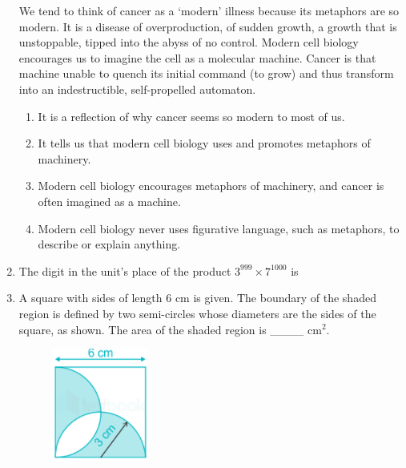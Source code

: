 \documentclass[12pt]{article}
\theoremstyle{remark}
\begin{document}
\begin{enumerate}
We tend to think of cancer as a ‘modern’ illness because its metaphors are so modern. It is a disease of overproduction, of sudden growth, a growth that is unstoppable, tipped into the abyss of no control. Modern cell biology encourages us to imagine the cell as a molecular machine. Cancer is that machine unable to quench its initial command (to grow) and thus transform into an indestructible, self-propelled automaton.\\
\begin{enumerate}
\item It is a reflection of why cancer seems so modern to most of us.
\item It tells us that modern cell biology uses and promotes metaphors of machinery.
\item Modern cell biology encourages metaphors of machinery, and cancer is often imagined as a machine.
\item Modern cell biology never uses figurative language, such as metaphors, to describe or explain anything.
\end{enumerate}
\hfill{}
\item The digit in the unit’s place of the product $3^{999} \times 7^{1000}$ is
\begin{enumerate}  \end{enumerate}
\hfill{}
\item A square with sides of length 6 cm is given. The boundary of the shaded region is defined by two semi-circles whose diameters are the sides of the square, as shown. The area of the shaded region is \_\_\_\_ cm$^2$.
\begin{figure}[H]
\centering
\includegraphics[width=0.3\textwidth]{Figs/Q10.png}

\end{figure}
\end{enumerate}
\end{document}
